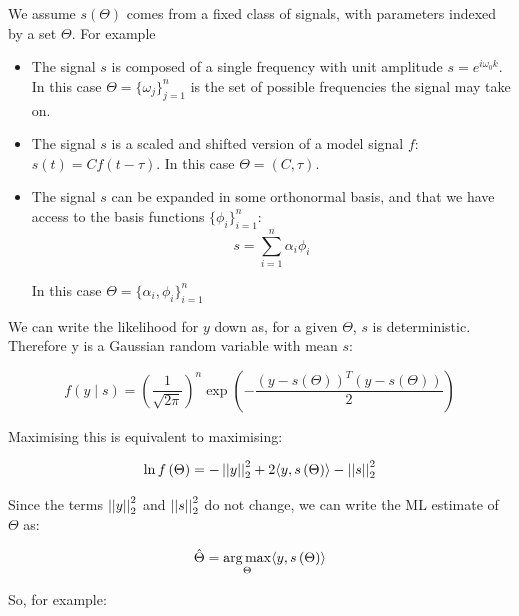 \documentclass{article}
\begin{document}
We assume \(s\left(\Theta\right)\) comes from a fixed class of signals, with parameters indexed by a set \(\Theta\). For example

\begin{itemize}
\item The signal \(s\) is composed of a single frequency with unit amplitude \(s = e^{i \omega_0 k}\). In this case \( \Theta = \{\omega_j\}_{j=1}^n \) is the set of possible frequencies the signal may take on.

\item The signal \(s\) is a scaled and shifted version of a model signal \(f\): \(s(t) = Cf\left(t - \tau\right)\). In this case \(\Theta = \left(C, \tau \right)\).

\item The signal \(s\) can be expanded in some orthonormal basis, and that we have access to the basis functions \(\{\phi_i\}_{i=1}^n\):
\begin{equation}
s = \sum_{i=1}^n \alpha_i \phi_i
\end{equation}

In this case \(\Theta = \{\alpha_i, \phi_i\}_{i=1}^n\)

\end{itemize}

We can write the likelihood for \(y\) down as, for a given \(\Theta\), \(s\) is deterministic. Therefore y is a Gaussian random variable with mean \(s\):

\begin{equation}
f\left(y \mid s\right) = \left(\frac{1}{\sqrt{2\pi}} \right)^n \exp{\left( - \frac{\left(y-s(\Theta)\right)^T\left(y-s(\Theta)\right)}{2} \right)}
\end{equation}

Maximising this is equivalent to maximising:

\begin{equation}
\ln f\left(\Theta\right) = -\left|\left|y\right|\right|_2^2 + 2\langle y, s\left(\Theta\right)\rangle - \left|\left|s\right|\right|_2^2
\end{equation}

Since the terms \(\left|\left|y\right|\right|_2^2\) and \(\left|\left|s\right|\right|_2^2\) do not change, we can write the ML estimate of \(\Theta\) as:

\begin{equation}
\hat{\Theta} = \operatorname*{arg\,max}_{\Theta} \langle y, s\left(\Theta\right)\rangle
\end{equation}

So, for example:
\end{document}
